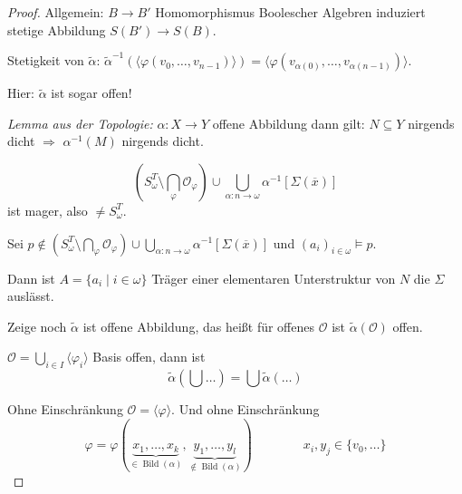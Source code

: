 \documentclass[12pt,parskip=full]{scrartcl}
\theoremstyle{definition}
\begin{document}
\begin{proof}
		Allgemein: $B \to B'$ Homomorphismus Boolescher Algebren induziert stetige Abbildung $S(B') \to S(B)$.
		
		Stetigkeit von $\tilde{\alpha}$: $\tilde{\alpha}^{-1}(\langle \varphi(v_0, \dots, v_{n-1})\rangle) = \langle \varphi(v_{\alpha(0)}, \dots, v_{\alpha(n-1)}) \rangle$.
		
		Hier: $\tilde{\alpha}$ ist sogar offen!
		
		\textit{Lemma aus der Topologie:} $\alpha: X \to Y$ offene Abbildung dann gilt: $N \subseteq Y$ nirgends dicht $\Rightarrow$ $\alpha^{-1}(M)$ nirgends dicht.
		
		\begin{equation*}
			\left( S_\omega^T \setminus \bigcap_\varphi \mathcal{O}_\varphi \right) \cup \bigcup_{\alpha: n \to \omega} \alpha^{-1}[\Sigma(\overline{x})]
		\end{equation*}
		ist mager, also $\neq S_\omega^T$.
		
		Sei $p \notin \left( S_\omega^T \setminus \bigcap_\varphi \mathcal{O}_\varphi \right) \cup \bigcup_{\alpha: n \to \omega} \alpha^{-1}[\Sigma(\overline{x})]$ und $(a_i)_{i \in \omega} \models p$.
		
		Dann ist $A = \{ a_i \mid i \in \omega \}$ Träger einer elementaren Unterstruktur von $N$ die $\Sigma$ auslässt.
		
		Zeige noch $\tilde{\alpha}$ ist offene Abbildung, das heißt für offenes $\mathcal{O}$ ist $\tilde{\alpha}(\mathcal{O})$ offen.
		
		$\mathcal{O} = \bigcup_{i \in I} \langle \varphi_i \rangle$ Basis offen, dann ist
		\begin{equation*}
			\tilde{\alpha}(\bigcup \dots) = \bigcup \tilde{\alpha}(\dots)
		\end{equation*}
		
		Ohne Einschränkung $\mathcal{O} = \langle \varphi \rangle$. Und ohne Einschränkung
		\begin{equation*}
			\varphi = \varphi(\underbrace{x_1, \dots, x_k}_{\in \operatorname{Bild}(\alpha)}, \underbrace{y_1, \dots, y_l}_{\notin \operatorname{Bild}(\alpha)}) \qquad\qquad x_i,y_j \in \{ v_0, \dots \}
		\end{equation*}
		

\end{proof}
\end{document}
